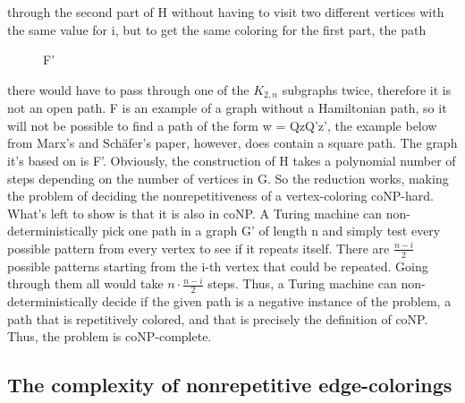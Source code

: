 \documentclass[12pt,a4paper]{article}
\begin{document}
through the second part of H without having to visit two different vertices with 
the same value for i, but to get the same coloring for the first part, the path \begin{wrapfigure}{l}{4cm}
	
	\caption{F'}
\end{wrapfigure}
there would have to pass through one of the $K_{2,n}$ subgraphs twice, therefore it is not an open path. F is an example of a graph without a Hamiltonian path, so it will not be possible to find a path of the form w = QzQ'z', the example below from Marx's and Schäfer's paper, however, does contain a square path. The graph it's based on is F'. 
\newline
\newline
Obviously, the construction of H takes a polynomial number of steps depending on the number of vertices in G. So the reduction works, making the problem of deciding the nonrepetitiveness of a vertex-coloring coNP-hard. What's left to show is that it is also in coNP. A Turing machine can non-deterministically pick one path in a graph G' of length n and simply test every possible pattern from every vertex to see if it repeats itself. There are $\frac{n - i}{2}$ possible patterns starting from the i-th vertex that could be repeated. Going through them all would take $n \cdot \frac{n - i}{2}$ steps. Thus, a Turing machine can non-deterministically decide if the given path is a negative instance of the problem, a path that is repetitively colored, and that is precisely the definition of coNP. Thus, the problem is coNP-complete.

\subsection{The complexity of nonrepetitive edge-colorings}
\end{document}
